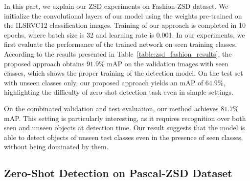 In this part, we explain our ZSD experiments on Fashion-ZSD dataset. We initialize the convolutional layers of our model
using the weights pre-trained on the ILSRVC12\cite{deng2009imagenet} classification images. Training of our approach is completed in 10 epochs,
where batch size is 32 and learning rate is 0.001. In our experiments, we first evaluate the performance of the trained
network on seen training classes. According to the results presented in Table~\ref{table:zsd_fashion_results}, the
proposed approach obtains $91.9\%$ mAP on the validation images with seen classes, which shows the proper training
of the detection model. On the test set with unseen classes only, our proposed approach yields an mAP of
$64.9\%$, highlighting the difficulty of zero-shot detection task even in simple settings.

On the combinated validation and test evaluation, our method achieves $81.7\%$ mAP. This setting
is particularly interesting, as it requires recognition over both seen and unseen objects at detection time.
Our result suggests that the model is able to detect objects of unseen test classes even in the presence of seen 
classes, without being dominated by them.

\begin{table}[]
\centering
{}
\caption{ZSD performances of proposed hybrid method on Fashion-ZSD dataset. We report class based average precision and mean average precision (mAP) scores.}
\label{table:zsd_fashion_results}
\end{table}

\subsection{Zero-Shot Detection on Pascal-ZSD Dataset}
\label{sec:pascalexp}

